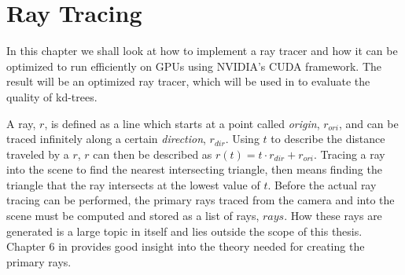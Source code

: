 


\chapter{Ray Tracing}\label{chp:rayTracing}





In this chapter we shall look at how to implement a ray tracer and how it can be
optimized to run efficiently on GPUs using NVIDIA's CUDA framework. The result
will be an optimized ray tracer, which will be used in 
to evaluate the quality of kd-trees.

A ray, $r$, is defined as a line which starts at a point called \textit{origin},
$r_{ori}$, and can be traced infinitely along a certain \textit{direction},
$r_{dir}$. Using $t$ to describe the distance traveled by a $r$, $r$ can then be
described as $r(t) = t \cdot r_{dir} + r_{ori}$. Tracing a ray into the scene to
find the nearest intersecting triangle, then means finding the triangle that the
ray intersects at the lowest value of $t$. Before the actual ray tracing can be
performed, the primary rays traced from the camera and into the scene must be
computed and stored as a list of rays, $rays$. How these rays are generated is a
large topic in itself and lies outside the scope of this thesis. Chapter 6 in
 provides good insight into the theory needed for creating
the primary rays.

